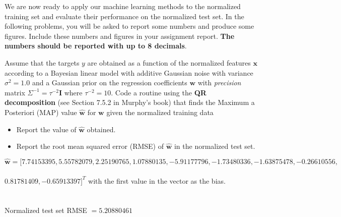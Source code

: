 \documentclass[submit]{harvardml}
\begin{document}
We are now ready to apply our machine learning methods to the normalized training set and
evaluate their performance on the normalized test set.
In the following problems, you will be asked to report some numbers and produce
some figures. Include these numbers and figures in your assignment report.
{\bf The numbers should be reported with up to 8 decimals}.
\vspace{0.2cm}

\begin{problem}[7pts]\label{prob:analytic_linear_model}
Assume that the targets $y$ are obtained as a function of the normalized
features $\mathbf{x}$ according to a Bayesian linear model with additive Gaussian noise with variance
$\sigma^2 = 1.0$ and a Gaussian prior on the regression coefficients $\mathbf{w}$
with \textit{precision} matrix $\Sigma^{-1} = \tau^{-2}\mathbf{I}$ where $\tau^{-2} = 10$. Code a routine
using the \textbf{QR decomposition} (see Section 7.5.2 in Murphy's book) that finds the Maximum a
Posteriori (MAP) value $\hat{\mathbf{w}}$ for $\mathbf{w}$ given the normalized
training data
\begin{itemize}
\item Report the value of $\hat{\mathbf{w}}$ obtained.
\item Report the root mean squared error (RMSE) of $\hat{\mathbf{w}}$ in the normalized test set.
\end{itemize}
\vspace{0.1cm}
\end{problem}






$\hat{\mathbf{w}}=[7.74153395,5.55782079,2.25190765,1.07880135,-5.91177796,-1.73480336,-1.63875478,-0.26610556,$\\\\
$0.81781409,-0.65913397]^T$ with the first value in the vector as the bias.\\\\\\
Normalized test set RMSE $=5.20880461$
\end{document}
